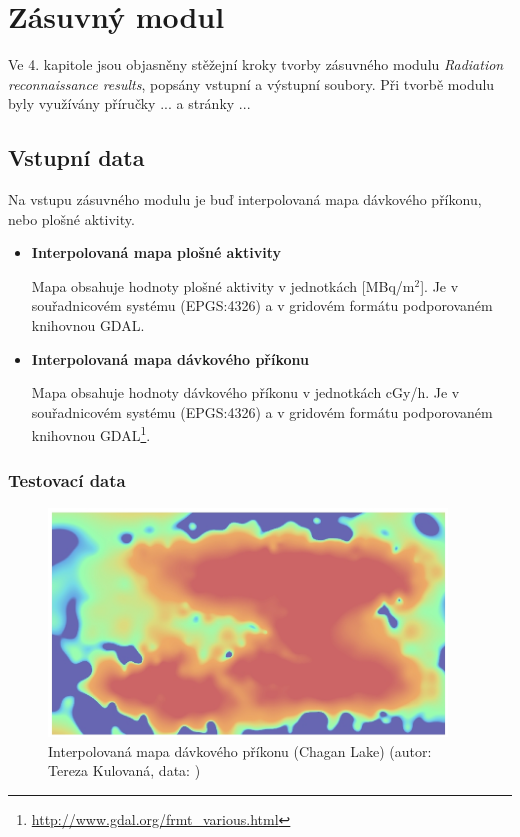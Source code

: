 \chapter{Zásuvný modul}
\label{4-plugin}

Ve 4. kapitole jsou objasněny stěžejní kroky tvorby zásuvného modulu \textit{Radiation reconnaissance results}, popsány vstupní a výstupní soubory. Při tvorbě modulu byly využívány příručky ... a stránky ...\cite{diveIntoPython}

\section{Vstupní data}

Na vstupu zásuvného modulu je buď interpolovaná mapa dávkového příkonu, nebo plošné aktivity.

\begin{itemize}
	\item \textbf{Interpolovaná mapa plošné aktivity}

Mapa obsahuje hodnoty plošné aktivity v jednotkách {[}MBq/m$^2${]}. Je v souřadnicovém systému  (EPGS:4326) a v gridovém formátu podporovaném knihovnou GDAL. 

	\item \textbf{Interpolovaná mapa dávkového příkonu}

Mapa obsahuje hodnoty dávkového příkonu v jednotkách cGy/h. Je v souřadnicovém systému  (EPGS:4326) a v gridovém formátu podporovaném knihovnou GDAL\footnote{\url{http://www.gdal.org/frmt_various.html}}.
	
\end{itemize}

\subsection{Testovací data}

\begin{figure}[H]
    \centering
      \includegraphics[width=300pt]{./pictures/chagan_spline.jpg}
      \caption[Interpolovaná mapa]{Interpolovaná mapa dávkového příkonu (Chagan Lake) (autor: Tereza Kulovaná, data: )}
      \label{fig:spline}
\end{figure}

